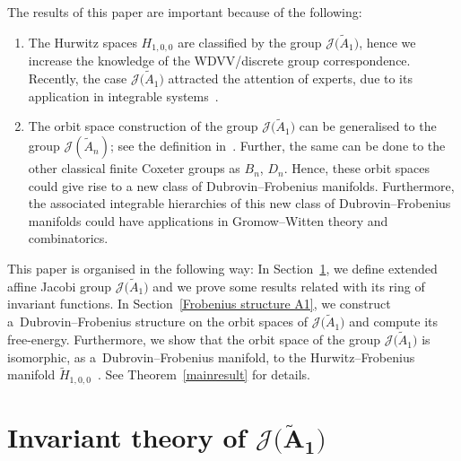 \documentclass[10pt,a4paper]{amsart}
\numberwithin{equation}{section}
\newcommand{\Ja}{\mathcal{J}}
\begin{document}
The results of this paper are important because of the following:
 \begin{enumerate}\itemsep=0pt
\item The Hurwitz spaces $H_{1,0,0}$ are classified by the group $\Ja\big(\tilde A_1\big)$, hence we increase the know\-ledge of the WDVV/discrete group correspondence. Recently, the case $\Ja\big(\tilde A_1\big)$ attracted the attention of experts, due to its application in integrable systems~\cite{M.CutimancoandV.Shramchenko, E.V.FerapontovM.V.PavlovL.Xue, Romano1}.

\item The orbit space construction of the group $\Ja\big(\tilde A_1\big)$ can be generalised to the group $\Ja(\tilde A_n)$; see the definition in~\cite{GAlmeida}. Further, the same can be done to the other classical finite Coxeter groups as $B_n$, $D_n$. Hence, these orbit spaces could give rise to a new class of Dubrovin--Frobenius manifolds. Furthermore, the associated integrable hierarchies of this new class of Dubrovin--Frobenius manifolds could have applications in Gromow--Witten theory and combinatorics.
\end{enumerate}

This paper is organised in the following way: In Section~\ref{invariant theory}, we define extended affine Jacobi group $\Ja\big(\tilde A_1\big)$ and we prove some results related with its ring of invariant functions. In Section~\ref{Frobenius structure A1}, we construct a~Dubrovin--Frobenius structure on the orbit spaces of $\Ja\big(\tilde A_1\big)$ and compute its free-energy. Furthermore, we show that the orbit space of the group $\Ja\big(\tilde A_1\big)$ is isomorphic, as a~Dubrovin--Frobenius manifold, to the Hurwitz--Frobenius manifold $\tilde H_{1,0,0}$~\cite{B.Dubrovin2, V.Shramchenko}. See Theorem~\ref{mainresult} for details.


\section[Invariant theory of J(A1)]
{Invariant theory of $\boldsymbol{\Ja\big(\tilde A_1\big)}$}\label{invariant theory}
\end{document}
